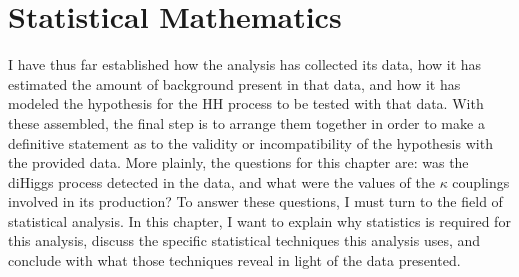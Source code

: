 %


\section{Statistical Mathematics}

    I have thus far established how the analysis has collected its data,
        how it has estimated the amount of background present in that data,
        and how it has modeled the hypothesis for the HH process to be tested with that data.
    With these assembled, the final step is to arrange them together in order to make a definitive statement
        as to the validity or incompatibility of the hypothesis with the provided data.
    More plainly, the questions for this chapter are:
        was the diHiggs process detected in the data,
        and what were the values of the $\kappa$ couplings involved in its production?
    To answer these questions, I must turn to the field of statistical analysis.
    In this chapter, I want to explain why statistics is required for this analysis,
        discuss the specific statistical techniques this analysis uses,
        and conclude with what those techniques reveal in light of the data presented.

